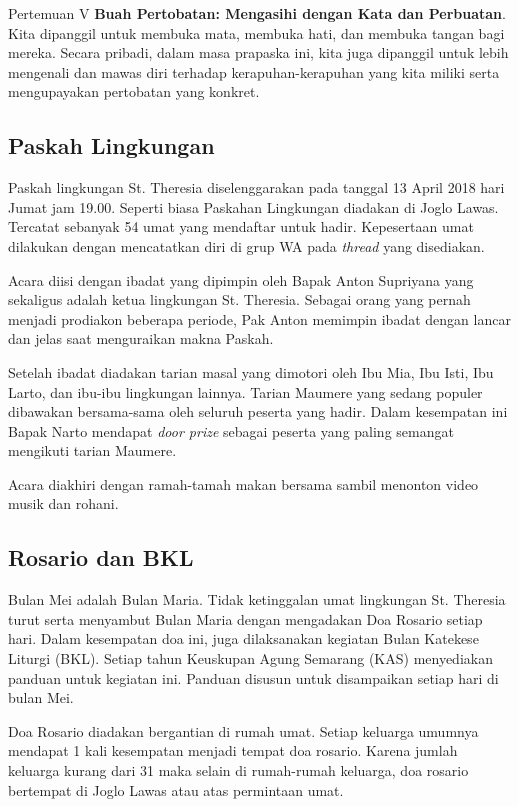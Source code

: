 Pertemuan V
\textbf{Buah Pertobatan: Mengasihi dengan Kata dan Perbuatan}.
Kita dipanggil untuk membuka mata, membuka hati, dan membuka tangan bagi mereka. Secara pribadi, dalam masa prapaska ini, kita juga dipanggil untuk lebih mengenali dan mawas diri terhadap kerapuhan-kerapuhan yang kita miliki serta mengupayakan pertobatan yang konkret.


	


\subsection*{Paskah Lingkungan}
Paskah lingkungan St. Theresia diselenggarakan pada tanggal 13 April 2018 hari Jumat jam 19.00. Seperti biasa Paskahan Lingkungan diadakan di Joglo Lawas. Tercatat sebanyak 54 umat yang mendaftar untuk hadir. Kepesertaan umat dilakukan dengan mencatatkan diri di grup WA pada \textit{thread} yang disediakan.

Acara diisi dengan ibadat yang dipimpin oleh Bapak Anton Supriyana yang sekaligus adalah ketua lingkungan St. Theresia. Sebagai orang yang pernah menjadi prodiakon beberapa periode, Pak Anton memimpin ibadat dengan lancar dan jelas saat menguraikan makna Paskah.

Setelah ibadat diadakan tarian masal yang dimotori oleh Ibu Mia, Ibu Isti, Ibu Larto, dan ibu-ibu lingkungan lainnya. Tarian Maumere yang sedang populer dibawakan bersama-sama oleh seluruh peserta yang hadir. Dalam kesempatan ini Bapak Narto mendapat \textit{door prize} sebagai peserta yang paling semangat mengikuti tarian Maumere.

Acara diakhiri dengan ramah-tamah makan bersama sambil menonton video musik dan rohani.

\subsection*{Rosario dan BKL}
Bulan Mei adalah Bulan Maria. Tidak ketinggalan umat lingkungan St. Theresia turut serta menyambut Bulan Maria dengan mengadakan Doa Rosario setiap hari. Dalam kesempatan doa ini, juga dilaksanakan kegiatan Bulan Katekese Liturgi (BKL). Setiap tahun Keuskupan Agung Semarang (KAS) menyediakan panduan untuk kegiatan ini. Panduan disusun untuk disampaikan setiap hari di bulan Mei.

Doa Rosario diadakan bergantian di rumah umat. Setiap keluarga umumnya mendapat 1 kali kesempatan menjadi tempat doa rosario. Karena jumlah keluarga kurang dari 31 maka selain di rumah-rumah keluarga, doa rosario bertempat di Joglo Lawas atau atas permintaan umat. 

